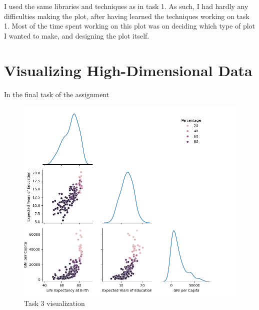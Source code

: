 \documentclass[11pt,a4paper,titlepage]{article}
\begin{document}
I used the same libraries and techniques as in task 1. As such, I had hardly any difficulties making the plot, after having learned the techniques working on task 1. Most of the time spent working on this plot was on deciding which type of plot I wanted to make, and designing the plot itself.

\section{Visualizing High-Dimensional Data}

In the final task of the assignment

\begin{figure}[h]
    \centering
    \includegraphics[width=1.0\linewidth]{reports/assignment-2/imgs/task3.png}
    \caption{Task 3 visualization}
    \label{fig:viz3}
\end{figure}


\end{document}
